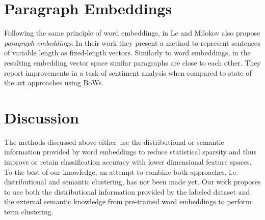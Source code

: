  \section{Paragraph Embeddings}
 
 Following the same principle of word embeddings, in \cite{le2014distributed} Le
 and Milokov also propose \emph{paragraph embeddings}. In their work they
 present a method to represent sentences of variable length as fixed-length
 vectors. Similarly to word embeddings, in the resulting embedding vector space
 similar paragraphs are close to each other. They report improvements in
 a task of sentiment analysis when compared to state of the art approaches using
 BoWs. 
 
 \section{Discussion}
 The methods discussed above either use the distributional or semantic
 information provided by word embeddings to reduce statistical sparsity and thus
 improve or retain classification accuracy with lower dimensional feature
 spaces. To the best of our knowledge, an attempt to combine both approaches,
 i.e. distributional and semantic clustering, has not been made yet. Our work
 proposes to use both the distributional information provided by the
 labeled dataset and the external semantic knowledge from pre-trained word
 embeddings to perform term clustering.
